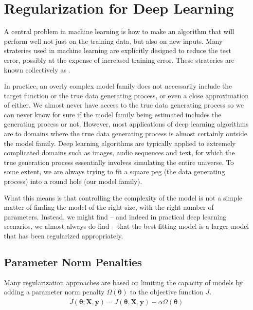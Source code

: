 
\chapter{Regularization for Deep Learning}

A central problem in machine learning is how to make an algorithm that will perform well not just on the training data, but also on new inputs.
Many strateries used in machine learning are explicitly designed to reduce the test error, possibly at the expense of increased training error.
These strateries are known collectively as .


In practice, an overly complex model family does not necessarily include the target function or the true data generating process, or even a close approximation of either.
We almost never have access to the true data generating process so we can never know for sure if the model family being estimated includes the generating process or not. 
However, most applications of deep learning algorithms are to domains where the true data generating process is almost certainly outside the model family. 
Deep learning algorithms are typically applied to extremely complicated domains such as images, audio sequences and text, for which the true generation process essentially involves simulating the entire universe. 
To some extent, we are always trying to fit a square peg (the data generating process) into a round hole (our model family).


What this means is that controlling the complexity of the model is not a simple matter of finding the model of the right size, with the right number of parameters.
Instead, we might find -- and indeed in practical deep learning scenarios, we almost always do find -- that the best fitting model is a larger model that has been regularized appropriately.


\section{Parameter Norm Penalties}

Many regularization approaches are based on limiting the capacity of models by adding a parameter norm penalty $\Omega(\bm{\theta})$ to the objective function $J$.
\begin{equation}
  \label{eq:norm-penalties}
  \tilde{J}(\bm{\theta;X,y}) = J(\bm{\theta,X,y}) + \alpha \Omega(\bm{\theta})
\end{equation}



